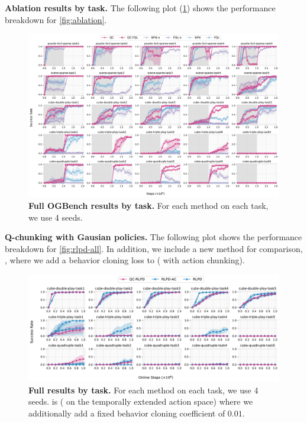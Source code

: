 \textbf{Ablation results by task.} The following plot (\cref{fig:ablation-all-individual}) shows the performance breakdown for \cref{fig:ablation}.
\begin{figure}[H]
    \centering
\includegraphics[width=\linewidth]{figures/main-all-individual.pdf}
    \caption{\textbf{Full OGBench results by task.} For each method on each task, we use 4 seeds.}
    \label{fig:ablation-all-individual}
\end{figure}


\textbf{Q-chunking with Gausian policies.}
The following plot shows the performance breakdown for \cref{fig:rlpd-all}. In addition, we include a new method for comparison, , where we add a behavior cloning loss to  ( with action chunking).
\begin{figure}[H]
    \centering
\includegraphics[width=\linewidth]{figures/rlpd-qc-all-individual.pdf}
    \caption{\textbf{Full  results by task.} For each method on each task, we use 4 seeds.  is  ( on the temporally extended action space) where we additionally add a fixed behavior cloning coefficient of $0.01$.}
    \label{fig:rlpd-all-ind}
\end{figure}

